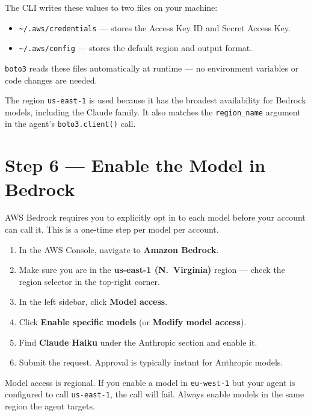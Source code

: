 \documentclass[12pt, a4paper]{article}
\begin{document}
The CLI writes these values to two files on your machine:

\begin{itemize}[leftmargin=1.5em]
  \item \texttt{\textasciitilde/.aws/credentials} — stores the Access Key ID and Secret Access Key.
  \item \texttt{\textasciitilde/.aws/config} — stores the default region and output format.
\end{itemize}

\texttt{boto3} reads these files automatically at runtime — no environment variables or code changes are needed.

\begin{notebox}
The region \texttt{us-east-1} is used because it has the broadest availability for Bedrock models, including the Claude family. It also matches the \texttt{region\_name} argument in the agent's \texttt{boto3.client()} call.
\end{notebox}

\section{Step 6 — Enable the Model in Bedrock}

AWS Bedrock requires you to explicitly opt in to each model before your account can call it. This is a one-time step per model per account.

\begin{enumerate}[leftmargin=1.5em]
  \item In the AWS Console, navigate to \textbf{Amazon Bedrock}.
  \item Make sure you are in the \textbf{us-east-1 (N.\ Virginia)} region — check the region selector in the top-right corner.
  \item In the left sidebar, click \textbf{Model access}.
  \item Click \textbf{Enable specific models} (or \textbf{Modify model access}).
  \item Find \textbf{Claude Haiku} under the Anthropic section and enable it.
  \item Submit the request. Approval is typically instant for Anthropic models.
\end{enumerate}

\begin{notebox}
Model access is regional. If you enable a model in \texttt{eu-west-1} but your agent is configured to call \texttt{us-east-1}, the call will fail. Always enable models in the same region the agent targets.
\end{notebox}
\end{document}
